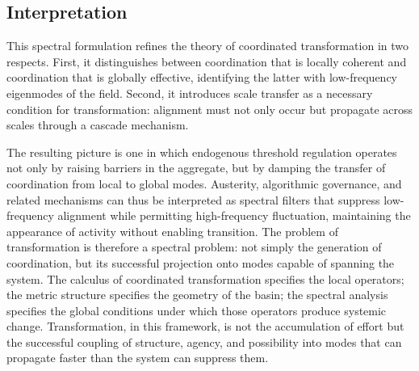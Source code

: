 \documentclass[11pt, a4paper]{article}
\begin{document}
\subsection{Interpretation}

This spectral formulation refines the theory of coordinated transformation in two respects. First, it distinguishes between coordination that is locally coherent and coordination that is globally effective, identifying the latter with low-frequency eigenmodes of the field. Second, it introduces scale transfer as a necessary condition for transformation: alignment must not only occur but propagate across scales through a cascade mechanism.

The resulting picture is one in which endogenous threshold regulation operates not only by raising barriers in the aggregate, but by damping the transfer of coordination from local to global modes. Austerity, algorithmic governance, and related mechanisms can thus be interpreted as spectral filters that suppress low-frequency alignment while permitting high-frequency fluctuation, maintaining the appearance of activity without enabling transition. The problem of transformation is therefore a spectral problem: not simply the generation of coordination, but its successful projection onto modes capable of spanning the system. The calculus of coordinated transformation specifies the local operators; the metric structure specifies the geometry of the basin; the spectral analysis specifies the global conditions under which those operators produce systemic change. Transformation, in this framework, is not the accumulation of effort but the successful coupling of structure, agency, and possibility into modes that can propagate faster than the system can suppress them.
\end{document}
